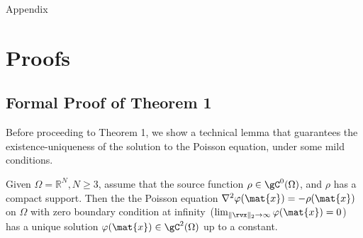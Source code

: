 \newpage

{\huge Appendix}


\def\E{{\bf E}}
\def\x{{\bf x}}
\def\r{{\bf r}}
\def\rhat{\hat{r}}

\section{Proofs}
\label{app:proofs}
\subsection{Formal Proof of Theorem 1}

Before proceeding to Theorem 1, we show a technical lemma that guarantees the existence-uniqueness of the solution to the Poisson equation, under some mild conditions. 
\begin{lemma}
\label{lemma:ex-uni}
{Given $\Omega=\mathbb{R}^N, N\ge 3$, assume that the source function $\rho \in \gC^0(\Omega)$, and $\rho$ has a compact support. Then the the Poisson equation $\nabla^2\varphi(\mat{x})=-\rho(\mat{x})$ on $\Omega$ with zero boundary condition at infinity~($\lim_{\parallel \rvx \parallel_2 \to \infty}\varphi(\mat{x})=0$) has a unique solution $\varphi(\mat{x})\in \gC^2(\Omega)$ up to a constant.}
\end{lemma}

